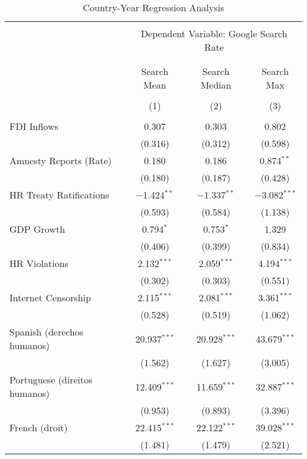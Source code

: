 
\begin{table}[!htbp] \centering 
  \caption{Country-Year Regression Analysis} 
  \label{} 
\begin{tabular}{@{\extracolsep{5pt}}lccc} 
\\[-1.8ex]\hline 
\hline \\[-1.8ex] 
 & \multicolumn{3}{c}{Dependent Variable: Google Search Rate} \\ 
\cline{2-4} 
\\[-1.8ex] & \multicolumn{3}{c}{ } \\ 
 & Search Mean & Search Median & Search Max \\ 
\\[-1.8ex] & (1) & (2) & (3)\\ 
\hline \\[-1.8ex] 
 FDI Inflows & 0.307 & 0.303 & 0.802 \\ 
  & (0.316) & (0.312) & (0.598) \\ 
  Amnesty Reports (Rate) & 0.180 & 0.186 & 0.874$^{**}$ \\ 
  & (0.180) & (0.187) & (0.428) \\ 
  HR Treaty Ratifications & $-$1.424$^{**}$ & $-$1.337$^{**}$ & $-$3.082$^{***}$ \\ 
  & (0.593) & (0.584) & (1.138) \\ 
  GDP Growth & 0.794$^{*}$ & 0.753$^{*}$ & 1.329 \\ 
  & (0.406) & (0.399) & (0.834) \\ 
  HR Violations & 2.132$^{***}$ & 2.059$^{***}$ & 4.194$^{***}$ \\ 
  & (0.302) & (0.303) & (0.551) \\ 
  Internet Censorship & 2.115$^{***}$ & 2.081$^{***}$ & 3.361$^{***}$ \\ 
  & (0.528) & (0.519) & (1.062) \\ 
  Spanish (derechos humanos) & 20.937$^{***}$ & 20.928$^{***}$ & 43.679$^{***}$ \\ 
  & (1.562) & (1.627) & (3.005) \\ 
  Portuguese (direitos humanos) & 12.409$^{***}$ & 11.659$^{***}$ & 32.887$^{***}$ \\ 
  & (0.953) & (0.893) & (3.396) \\ 
  French (droit) & 22.415$^{***}$ & 22.122$^{***}$ & 39.028$^{***}$ \\ 
  & (1.481) & (1.479) & (2.521) \\ 

\end{tabular}
\end{table}
